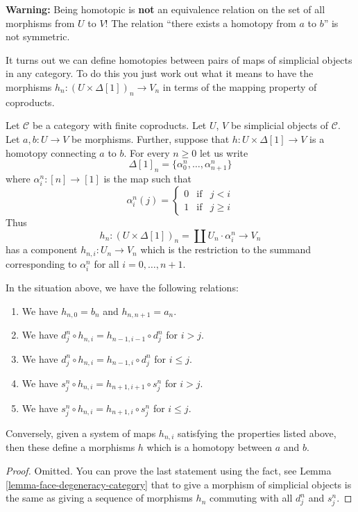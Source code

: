 \noindent
{\bf Warning:} Being homotopic is {\bf not} an equivalence relation on
the set of all morphisms from $U$ to $V$! The relation
``there exists a homotopy from $a$ to $b$'' is not symmetric.

\medskip\noindent
It turns out we can define homotopies between pairs of maps of simplicial
objects in any category. To do this you just work out what it means to have
the morphisms $h_n : (U \times \Delta[1])_n \to V_n$ in terms of the mapping
property of coproducts.

\medskip\noindent
Let $\mathcal{C}$ be a category with finite coproducts.
Let $U$, $V$ be simplicial objects of $\mathcal{C}$.
Let $a, b : U \to V$ be morphisms. Further, suppose
that $h : U \times \Delta[1] \to V$ is a homotopy
connecting $a$ to $b$. For every $n \geq 0$
let us write
$$
\Delta[1]_n = \{\alpha^n_0, \ldots, \alpha^n_{n + 1}\}
$$
where $\alpha^n_i : [n] \to [1]$ is the map
such that
$$
\alpha^n_i(j)
=
\left\{
\begin{matrix}
0 & \text{if} & j < i\\
1 & \text{if} & j \geq i
\end{matrix}
\right.
$$
Thus
$$
h_n : (U \times \Delta[1])_n = \coprod U_n \cdot \alpha^n_i
\longrightarrow
V_n
$$
has a component $h_{n, i} : U_n \to V_n$ which is the restriction
to the summand corresponding to $\alpha^n_i$ for all $i = 0, \ldots, n + 1$.

\begin{lemma}
\label{lemma-relations-homotopy}
In the situation above, we have the following relations:
\begin{enumerate}
\item We have $h_{n, 0} = b_n$ and $h_{n, n + 1} = a_n$.
\item We have $d^n_j \circ h_{n, i} = h_{n - 1, i - 1} \circ d^n_j$
for $i > j$.
\item We have $d^n_j \circ h_{n, i} = h_{n - 1, i} \circ d^n_j$
for $i \leq j$.
\item We have $s^n_j \circ h_{n, i} = h_{n + 1, i + 1} \circ s^n_j$
for $i > j$.
\item We have $s^n_j \circ h_{n, i} = h_{n + 1, i} \circ s^n_j$
for $i \leq j$.
\end{enumerate}
Conversely, given a system of maps $h_{n, i}$ satisfying the
properties listed above, then these define a morphisms
$h$ which is a homotopy between $a$ and $b$.
\end{lemma}

\begin{proof}
Omitted. You can prove the last statement using the fact,
see Lemma \ref{lemma-face-degeneracy-category} that
to give a morphism of simplicial objects is the
same as giving a sequence of morphisms $h_n$ commuting
with all $d^n_j$ and $s^n_j$.
\end{proof}

